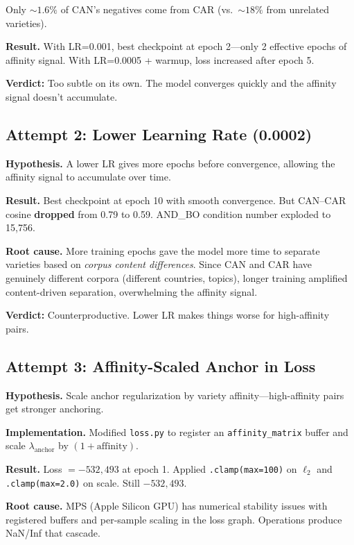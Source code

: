 \documentclass[11pt,a4paper]{article}
\begin{document}
Only ${\sim}1.6\%$ of CAN's negatives come from CAR (vs.\ ${\sim}18\%$ from unrelated varieties).

\textbf{Result.} With LR=0.001, best checkpoint at epoch 2---only 2 effective epochs of affinity signal. With LR=0.0005 + warmup, loss increased after epoch 5.

\textbf{Verdict:} \colorbox{red!10}{Too subtle on its own.} The model converges quickly and the affinity signal doesn't accumulate.

\subsection{Attempt 2: Lower Learning Rate (0.0002)}

\textbf{Hypothesis.} A lower LR gives more epochs before convergence, allowing the affinity signal to accumulate over time.

\textbf{Result.} Best checkpoint at epoch 10 with smooth convergence. But CAN--CAR cosine \textbf{dropped} from 0.79 to 0.59. AND\_BO condition number exploded to 15{,}756.

\textbf{Root cause.} More training epochs gave the model more time to separate varieties based on \emph{corpus content differences}. Since CAN and CAR have genuinely different corpora (different countries, topics), longer training amplified content-driven separation, overwhelming the affinity signal.

\textbf{Verdict:} \colorbox{red!10}{Counterproductive.} Lower LR makes things worse for high-affinity pairs.

\subsection{Attempt 3: Affinity-Scaled Anchor in Loss}

\textbf{Hypothesis.} Scale anchor regularization by variety affinity---high-affinity pairs get stronger anchoring.

\textbf{Implementation.} Modified \texttt{loss.py} to register an \texttt{affinity\_matrix} buffer and scale $\lambda_{\text{anchor}}$ by $(1 + \text{affinity})$.

\textbf{Result.} Loss $= -532{,}493$ at epoch 1. Applied \texttt{.clamp(max=100)} on $\ell_2$ and \texttt{.clamp(max=2.0)} on scale. Still $-532{,}493$.

\textbf{Root cause.} MPS (Apple Silicon GPU) has numerical stability issues with registered buffers and per-sample scaling in the loss graph. Operations produce NaN/Inf that cascade.
\end{document}
